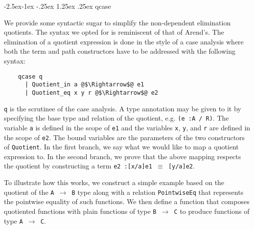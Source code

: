 \documentclass[12pt,twoside,maitrise]{dms}
\makeatletter
\theoremstyle{definition}
\numberwithin{equation}{section}
\numberwithin{table}{chapter}
\numberwithin{figure}{chapter}
\newcommand\id[1] {\texttt{#1}}
\newcommand\fn[1] {\texttt{#1}}
\renewcommand\paragraph{\@startsection{paragraph}{4}{\z@}%
            {-2.5ex\@plus -1ex \@minus -.25ex}%
            {1.25ex \@plus .25ex}%
            {\normalfont\normalsize\bfseries}}
\makeatother
\begin{document}
\paragraph{qcase}

We provide some syntactic sugar to simplify the non-dependent elimination
quotients. The syntax we opted for is reminiscent of that of
Arend's\cite{arend}. The elimination of a quotient expression is done in the
style of a case analysis where both the term and path constructors have to be
addressed with the following syntax:

\begin{verbatim}
    qcase q
      | Quotient_in a @$\Rightarrow$@ e1
      | Quotient_eq x y r @$\Rightarrow$@ e2
\end{verbatim}

\id{q} is the scrutinee of the case analysis. A type annotation may be given to it
by specifying the base type and relation of the quotient, e.g. \fn{(e :\@ A / R)}.
The variable \id{a} is defined in the scope of \id{e1} and the variables \id{x},
\id{y}, and \id{r} are defined in the scope of \id{e2}. The bound variables are
the parameters of the two constructors of \id{Quotient}. In the first branch, we
say what we would like to map a quotient expression to. In the second branch, we
prove that the above mapping respects the quotient by constructing a term
\fn{e2 :\@ [x/a]e1 $\equiv$ [y/a]e2}.

To illustrate how this works, we construct a simple example based on the
quotient of the \id{A $\rightarrow$ B} type along with a relation
\id{PointwiseEq} that represents the pointwise equality of such functions. We
then define a function that composes quotiented functions with plain functions
of type \id{B $\rightarrow$ C} to produce functions of type \id{A $\rightarrow$
  C}.


\end{document}
